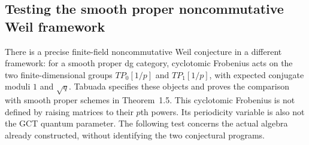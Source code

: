 \subsection{Testing the smooth proper noncommutative Weil framework}
There is a precise finite-field noncommutative Weil conjecture in a
different framework: for a smooth proper dg category, cyclotomic
Frobenius acts on the two finite-dimensional groups $TP_0[1/p]$
and $TP_1[1/p]$, with expected conjugate moduli $1$ and $\sqrt q$.
Tabuada \cite[\S1, pp.~2--3; \S5.1, pp.~13--14; \S6.1,
pp.~15--16]{TabuadaWeil} specifies these objects and proves the
comparison with smooth proper schemes in Theorem~1.5.
This cyclotomic Frobenius is not defined by raising matrices to
their $p$th powers. Its periodicity variable is also not the GCT
quantum parameter. The following test concerns the actual algebra
already constructed, without identifying the two conjectural programs.

